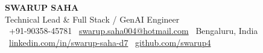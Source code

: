 \documentclass[10pt, letterpaper]{article}
\begin{document}
\noindent{}
\vspace{0.18in}
\hspace{0.6in}\begin{minipage}{\dimexpr\paperwidth-1.2in\relax}
{\fontsize{22}{26}\bfseries\color{white} SWARUP SAHA}\\[3pt]
{\fontsize{10.5}{13}\color{white} Technical Lead \& Full Stack / GenAI Engineer}\\[6pt]
{\color{white}\fontsize{9}{11}\selectfont
\faPhone\ +91-90358-45781\enspace\enspace
\faEnvelope\ \href{mailto:swarup.saha004@hotmail.com}{swarup.saha004@hotmail.com}\enspace\enspace
\faMapMarker*\ Bengaluru, India\enspace\enspace
\faLinkedin\ \href{https://linkedin.com/in/swarup-saha-d7}{linkedin.com/in/swarup-saha-d7}\enspace\enspace
\faGithub\ \href{https://github.com/swarup4}{github.com/swarup4}}
\end{minipage}
\vspace{0.55in}
\end{document}
